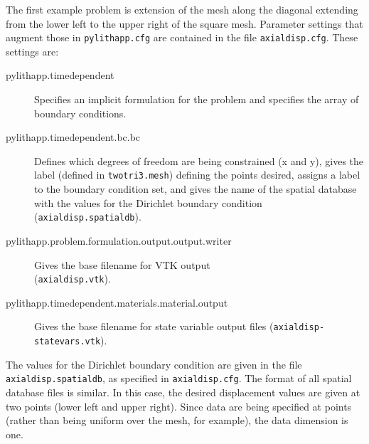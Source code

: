 The first example problem is extension of the mesh along the diagonal
extending from the lower left to the upper right of the square mesh.
Parameter settings that augment those in \texttt{pylithapp.cfg} are
contained in the file \texttt{axialdisp.cfg}. These settings are:
\begin{description}
\item [{pylithapp.timedependent}] Specifies an implicit formulation for
the problem and specifies the array of boundary conditions.
\item [{pylithapp.timedependent.bc.bc}] Defines which degrees of freedom
are being constrained (x and y), gives the label (defined in \texttt{twotri3.mesh})
defining the points desired, assigns a label to the boundary condition
set, and gives the name of the spatial database with the values for
the Dirichlet boundary condition (\texttt{axialdisp.spatialdb}).
\item [{pylithapp.problem.formulation.output.output.writer}] Gives the
base filename for VTK output \\
(\texttt{axialdisp.vtk}).
\item [{pylithapp.timedependent.materials.material.output}] Gives the base
filename for state variable output files \linebreak{}
(\texttt{axialdisp-statevars.vtk}).
\end{description}
The values for the Dirichlet boundary condition are given in the file
\texttt{axialdisp.spatialdb}, as specified in \texttt{axialdisp.cfg}.
The format of all spatial database files is similar. In this case,
the desired displacement values are given at two points (lower left
and upper right). Since data are being specified at points (rather
than being uniform over the mesh, for example), the data dimension
is one.

